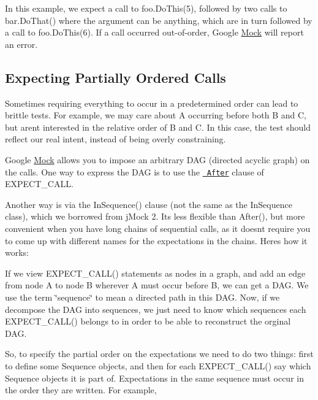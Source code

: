 In this example, we expect a call to {\ttfamily foo.\+Do\+This(5)}, followed by two calls to {\ttfamily bar.\+Do\+That()} where the argument can be anything, which are in turn followed by a call to {\ttfamily foo.\+Do\+This(6)}. If a call occurred out-\/of-\/order, Google \mbox{\hyperlink{class_mock}{Mock}} will report an error.

\subsection*{Expecting Partially Ordered Calls}

Sometimes requiring everything to occur in a predetermined order can lead to brittle tests. For example, we may care about {\ttfamily A} occurring before both {\ttfamily B} and {\ttfamily C}, but aren\textquotesingle{}t interested in the relative order of {\ttfamily B} and {\ttfamily C}. In this case, the test should reflect our real intent, instead of being overly constraining.

Google \mbox{\hyperlink{class_mock}{Mock}} allows you to impose an arbitrary D\+AG (directed acyclic graph) on the calls. One way to express the D\+AG is to use the \href{http://code.google.com/p/googlemock/wiki/V1_6_CheatSheet#The_After_Clause}\texttt{ After} clause of {\ttfamily E\+X\+P\+E\+C\+T\+\_\+\+C\+A\+LL}.

Another way is via the {\ttfamily In\+Sequence()} clause (not the same as the {\ttfamily In\+Sequence} class), which we borrowed from j\+Mock 2. It\textquotesingle{}s less flexible than {\ttfamily After()}, but more convenient when you have long chains of sequential calls, as it doesn\textquotesingle{}t require you to come up with different names for the expectations in the chains. Here\textquotesingle{}s how it works\+:

If we view {\ttfamily E\+X\+P\+E\+C\+T\+\_\+\+C\+A\+L\+L()} statements as nodes in a graph, and add an edge from node A to node B wherever A must occur before B, we can get a D\+AG. We use the term \char`\"{}sequence\char`\"{} to mean a directed path in this D\+AG. Now, if we decompose the D\+AG into sequences, we just need to know which sequences each {\ttfamily E\+X\+P\+E\+C\+T\+\_\+\+C\+A\+L\+L()} belongs to in order to be able to reconstruct the orginal D\+AG.

So, to specify the partial order on the expectations we need to do two things\+: first to define some {\ttfamily Sequence} objects, and then for each {\ttfamily E\+X\+P\+E\+C\+T\+\_\+\+C\+A\+L\+L()} say which {\ttfamily Sequence} objects it is part of. Expectations in the same sequence must occur in the order they are written. For example,


